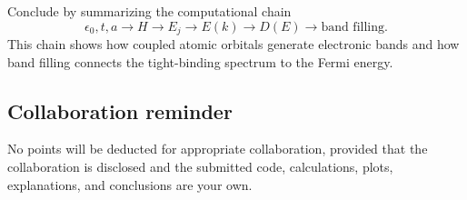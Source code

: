 Conclude by summarizing the computational chain
\[
\epsilon_0,t,a
\longrightarrow
H
\longrightarrow
E_j
\longrightarrow
E(k)
\longrightarrow
D(E)
\longrightarrow
\text{band filling}.
\]
This chain shows how coupled atomic orbitals generate electronic bands and how band filling connects the tight-binding spectrum to the Fermi energy.

\subsection{Collaboration reminder}

No points will be deducted for appropriate collaboration, provided that the collaboration is disclosed and the submitted code, calculations, plots, explanations, and conclusions are your own.